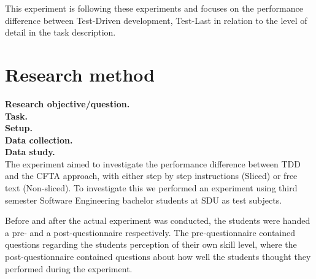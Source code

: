 \documentclass{sig-alternate-05-2015}
\begin{document}
This  experiment is following these experiments and focuses on the performance difference between Test-Driven development, Test-Last  in relation to the level of detail in the task description.

\section{Research method}

\label{sec:Research method}
\textbf{Research objective/question.}\\
\textbf{Task.}\\
\textbf{Setup.}\\
\textbf{Data collection.}\\
\textbf{Data study.}\\



The experiment aimed to investigate the performance difference between TDD and the CFTA approach, with either step by step instructions (Sliced) or free text (Non-sliced). To investigate this we performed an experiment using third semester Software Engineering bachelor students at SDU as test subjects.


Before and after the actual experiment was conducted, the students were handed a pre- and a post-questionnaire respectively.
The pre-questionnaire contained questions regarding the students perception of their own skill level, where the post-questionnaire contained questions about how well the students thought they performed during the experiment.
\end{document}
